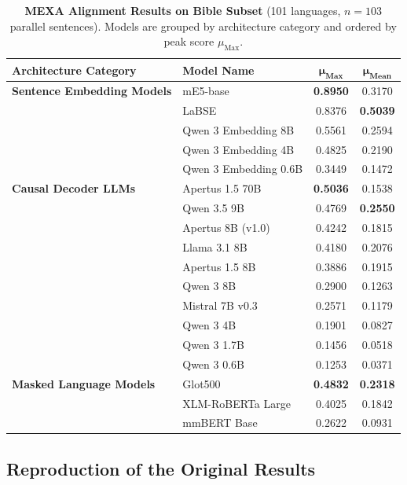 \begin{table}[t]
\centering
\caption{\textbf{MEXA Alignment Results on Bible Subset} (101 languages, $n = 103$ parallel sentences). Models are grouped by architecture category and ordered by peak score $\mu_{\text{Max}}$.}
\label{tab:mexa-bible-table1}
\begin{tabular}{llcc}
\toprule
\textbf{Architecture Category} & \textbf{Model Name} & $\mathbf{\mu_{\text{Max}}}$ & $\mathbf{\mu_{\text{Mean}}}$ \\
\midrule
\textbf{Sentence Embedding Models}
  & mE5-base & \textbf{0.8950} & 0.3170 \\
  & LaBSE & 0.8376 & \textbf{0.5039} \\
  & Qwen 3 Embedding 8B & 0.5561 & 0.2594 \\
  & Qwen 3 Embedding 4B & 0.4825 & 0.2190 \\
  & Qwen 3 Embedding 0.6B & 0.3449 & 0.1472 \\
\midrule
\textbf{Causal Decoder LLMs}
  & Apertus 1.5 70B & \textbf{0.5036} & 0.1538 \\
  & Qwen 3.5 9B & 0.4769 & \textbf{0.2550} \\
  & Apertus 8B (v1.0) & 0.4242 & 0.1815 \\
  & Llama 3.1 8B & 0.4180 & 0.2076 \\
  & Apertus 1.5 8B & 0.3886 & 0.1915 \\
  & Qwen 3 8B & 0.2900 & 0.1263 \\
  & Mistral 7B v0.3 & 0.2571 & 0.1179 \\
  & Qwen 3 4B & 0.1901 & 0.0827 \\
  & Qwen 3 1.7B & 0.1456 & 0.0518 \\
  & Qwen 3 0.6B & 0.1253 & 0.0371 \\
\midrule
\textbf{Masked Language Models}
  & Glot500 & \textbf{0.4832} & \textbf{0.2318} \\
  & XLM-RoBERTa Large & 0.4025 & 0.1842 \\
  & mmBERT Base & 0.2622 & 0.0931 \\
\bottomrule
\end{tabular}
\end{table}

\subsection{Reproduction of the Original Results}
\label{subsec:results-reproduction}

